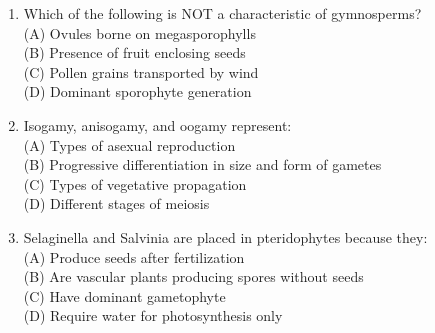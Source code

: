 \documentclass{article}
\begin{document}
\begin{enumerate}[label=Q\arabic*.]
\item Which of the following is NOT a characteristic of gymnosperms?
\\(A) Ovules borne on megasporophylls
\\(B) Presence of fruit enclosing seeds
\\(C) Pollen grains transported by wind
\\(D) Dominant sporophyte generation

\item Isogamy, anisogamy, and oogamy represent:
\\(A) Types of asexual reproduction
\\(B) Progressive differentiation in size and form of gametes
\\(C) Types of vegetative propagation
\\(D) Different stages of meiosis

\item Selaginella and Salvinia are placed in pteridophytes because they:
\\(A) Produce seeds after fertilization
\\(B) Are vascular plants producing spores without seeds
\\(C) Have dominant gametophyte
\\(D) Require water for photosynthesis only

\end{enumerate}
\end{document}
